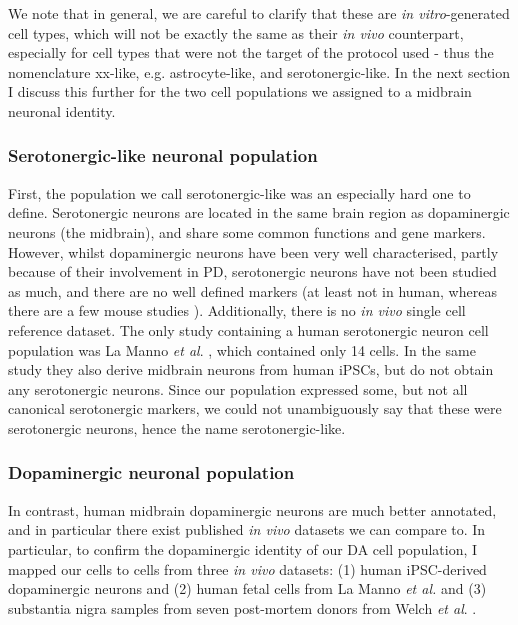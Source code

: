 We note that in general, we are careful to clarify that these are \textit{in vitro}-generated cell types, which will not be exactly the same as their \textit{in vivo} counterpart, especially for cell types that were not the target of the protocol used - thus the nomenclature xx-like, e.g. astrocyte-like, and serotonergic-like.
In the next section I discuss this further for the two cell populations we assigned to a midbrain neuronal identity.

\subsubsection{Serotonergic-like neuronal population}

First, the population we call serotonergic-like was an especially hard one to define.
Serotonergic neurons are located in the same brain region as dopaminergic neurons 
(the midbrain),
and share some common functions and gene markers.
However, whilst dopaminergic neurons have been very well characterised, partly because of their involvement in PD, serotonergic neurons have not been studied as much, and there are no well defined markers (at least not in human, whereas there are a few mouse studies \cite{cummings2019serotonergic}).
Additionally, there is no \textit{in vivo} single cell reference dataset.
The only study containing a human serotonergic neuron cell population was La Manno \textit{et al}. \cite{la2016molecular}, which contained only 14 cells.
In the same study they also derive midbrain neurons from human iPSCs, but do not obtain any serotonergic neurons.
Since our population expressed some, but not all canonical serotonergic markers, 
we could not unambiguously say that these were serotonergic neurons, hence the name serotonergic-like.

\subsubsection{Dopaminergic neuronal population}

In contrast, human midbrain dopaminergic neurons are much better annotated, and in particular there exist published \textit{in vivo} datasets we can compare to.
In particular, to confirm the dopaminergic identity of our DA cell population, I mapped our cells to cells from three \textit{in vivo} datasets:
(1) human iPSC-derived dopaminergic neurons and (2) human fetal cells from La Manno \textit{et al.} \cite{la2016molecular} and (3) substantia nigra samples from seven post-mortem donors from Welch \textit{et al}. \cite{welch2019single}. \\

